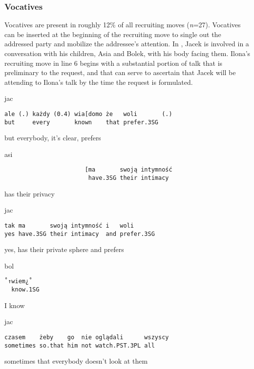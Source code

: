 \documentclass[output=paper]{langsci/langscibook}
\begin{document}
\subsubsection{Vocatives}

Vocatives are present in roughly 12\% of all recruiting moves (\textit{n}=27). Vocatives can be inserted at the beginning of the recruiting move to single out the addressed party and mobilize the addressee’s attention.  In , Jacek is involved in a conversation with his children, Asia and Bolek, with his body facing them.  Ilona’s recruiting move in line 6 begins with a substantial portion of talk that is preliminary to the request, and that can serve to ascertain that Jacek will be attending to Ilona’s talk by the time the request is formulated.

\vspace{2mm}
%
\begin{transbox}{1}{jac}
\begin{verbatim}
ale (.) każdy (0.4) wia[domo że   woli       (.)
but     every       known    that prefer.3SG
\end{verbatim}
but everybody, it’s clear, prefers
\end{transbox}
%
\begin{transbox}{2}{asi}
\begin{verbatim}
                       [ma       swoją intymność
                        have.3SG their intimacy
\end{verbatim}
\hspace{3.5cm} has their privacy
\end{transbox}
%
\begin{transbox}{3}{jac}
\begin{verbatim}
tak ma       swoją intymność i   woli
yes have.3SG their intimacy  and prefer.3SG
\end{verbatim}
yes, has their private sphere and prefers
\end{transbox}
%
\begin{transbox}{4}{bol}
\begin{verbatim}
˚↑wiem¿˚
  know.1SG
\end{verbatim}
\hspace{0.07cm} I know
\end{transbox}
%
\begin{transbox}{5}{jac}
\begin{verbatim}
czasem    żeby    go  nie oglądali      wszyscy
sometimes so.that him not watch.PST.3PL all
\end{verbatim}
sometimes that everybody doesn’t look at them
\end{transbox}
\end{document}
